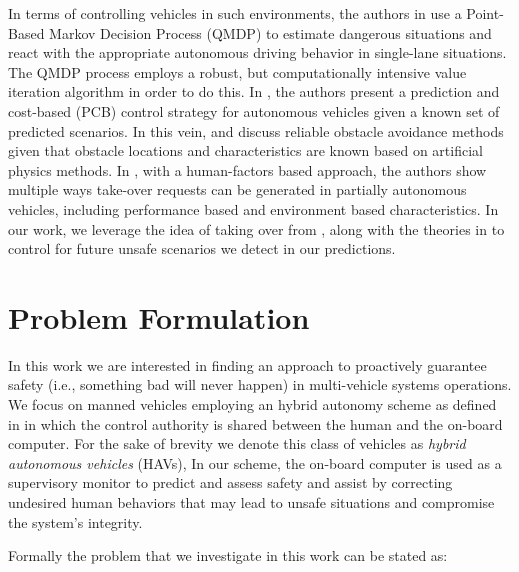 \documentclass[letterpaper, 10 pt, conference]{ieeeconf}  %
\begin{document}
In terms of controlling vehicles in such environments, the authors in \cite{qmdp} use a Point-Based Markov Decision Process (QMDP) to estimate dangerous situations and react with the appropriate autonomous driving behavior in single-lane situations. The QMDP process employs a robust, but computationally intensive value iteration algorithm in order to do this. In \cite{predcost}, the authors present a prediction and cost-based (PCB) control strategy for autonomous vehicles given a known set of predicted scenarios. In this vein, \cite{vfh+} and \cite{vfh*} discuss reliable obstacle avoidance methods given that obstacle locations and characteristics are known based on artificial physics methods. In \cite{takeover}, with a human-factors based approach, the authors show multiple ways take-over requests can be generated in partially autonomous vehicles, including performance based and environment based characteristics. In our work, we leverage the idea of taking over from \cite{takeover}, along with the theories in \cite{vfh*} to control for future unsafe scenarios we detect in our predictions.

    
\section{Problem Formulation} \label{sec:probform}
 
In this work we are interested in finding an approach to proactively guarantee safety (i.e., something bad will never happen) in multi-vehicle systems operations. We focus on manned vehicles employing an hybrid autonomy scheme as defined in \cite{} in which the control authority is shared between the human and the on-board computer. For the sake of brevity we denote this class of vehicles as {\em hybrid autonomous vehicles} (HAVs), In our scheme, the on-board computer is used as a supervisory monitor to predict and assess safety and assist by correcting undesired human behaviors that may lead to unsafe situations and compromise the system's integrity. 

Formally the problem that we investigate in this work can be stated as: 
\end{document}
